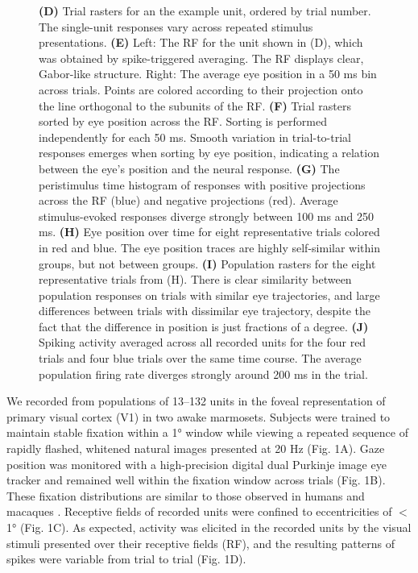 \documentclass{lite}
\begin{document}
\begin{figure}[!t]
    \ContinuedFloat
    \caption[]{
    \textbf{(D)} Trial rasters for an the example unit, ordered by trial number. The single-unit responses vary across repeated stimulus presentations. 
    \textbf{(E)} Left: The RF for the unit shown in (D), which was obtained by spike-triggered averaging. The RF displays clear, Gabor-like structure. Right: The average eye position in a 50 ms bin across trials. Points are colored according to their projection onto the line orthogonal to the subunits of the RF. 
    \textbf{(F)} Trial rasters sorted by eye position across the RF. Sorting is performed independently for each 50 ms. Smooth variation in trial-to-trial responses emerges when sorting by eye position, indicating a relation between the eye's position and the neural response. 
    \textbf{(G)} The peristimulus time histogram of responses with positive projections across the RF (blue) and negative projections (red). Average stimulus-evoked responses diverge strongly between 100 ms and 250 ms. 
    \textbf{(H)}  Eye position over time for eight representative trials colored in red and blue. The eye position traces are highly self-similar within groups, but not between groups. 
    \textbf{(I)} Population rasters for the eight representative trials from (H). There is clear similarity between population responses on trials with similar eye trajectories, and large differences between trials with dissimilar eye trajectory, despite the fact that the difference in position is just fractions of a degree. 
    \textbf{(J)} Spiking activity averaged across all recorded units for the four red trials and four blue trials over the same time course. The average population firing rate diverges strongly around 200 ms in the trial. 
    }
\end{figure}


We recorded from populations of 13--132 units in the foveal representation of primary visual cortex (V1) in two awake marmosets. Subjects were trained to maintain stable fixation within a 1° window while viewing a repeated sequence of rapidly flashed, whitened natural images presented at 20 Hz (Fig. 1A). Gaze position was monitored with a high-precision digital dual Purkinje image eye tracker \cite{yates2023detailed} and remained well within the fixation window across trials (Fig. 1B). These fixation distributions are similar to those observed in humans and macaques \cite{cherici2012precision, ressmeyer2025openirisdpi}. Receptive fields of recorded units were confined to eccentricities of $<$1° (Fig. 1C). As expected, activity was elicited in the recorded units by the visual stimuli presented over their receptive fields (RF), and the resulting patterns of spikes were variable from trial to trial (Fig. 1D). 
\end{document}
